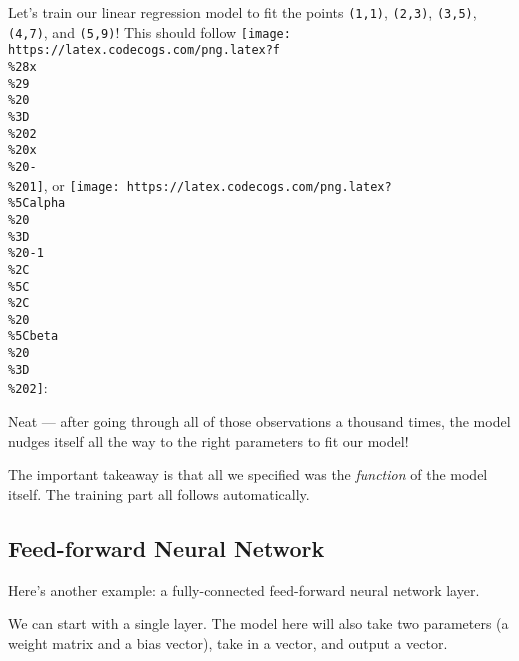 \documentclass[]{article}
\newenvironment{Shaded}{}{}
\newcommand{\CommentTok}[1]{\textcolor[rgb]{0.38,0.63,0.69}{\textit{#1}}}
\newcommand{\DecValTok}[1]{\textcolor[rgb]{0.25,0.63,0.44}{#1}}
\newcommand{\FloatTok}[1]{\textcolor[rgb]{0.25,0.63,0.44}{#1}}
\newcommand{\FunctionTok}[1]{\textcolor[rgb]{0.02,0.16,0.49}{#1}}
\newcommand{\NormalTok}[1]{#1}
\begin{document}
Let's train our linear regression model to fit the points \texttt{(1,1)},
\texttt{(2,3)}, \texttt{(3,5)}, \texttt{(4,7)}, and \texttt{(5,9)}! This should
follow
\texttt{[image: https://latex.codecogs.com/png.latex?f\\\%28x\\\%29\\\%20\\\%3D\\\%202\\\%20x\\\%20-\\\%201]},
or
\texttt{[image: https://latex.codecogs.com/png.latex?\\\%5Calpha\\\%20\\\%3D\\\%20-1\\\%2C\\\%5C\\\%2C\\\%20\\\%5Cbeta\\\%20\\\%3D\\\%202]}:

\begin{Shaded}
\end{Shaded}

Neat --- after going through all of those observations a thousand times, the
model nudges itself all the way to the right parameters to fit our model!

The important takeaway is that all we specified was the \emph{function} of the
model itself. The training part all follows automatically.

\hypertarget{feed-forward-neural-network}{%
\subsection{Feed-forward Neural Network}\label{feed-forward-neural-network}}

Here's another example: a fully-connected feed-forward neural network layer.

We can start with a single layer. The model here will also take two parameters
(a weight matrix and a bias vector), take in a vector, and output a vector.
\end{document}
